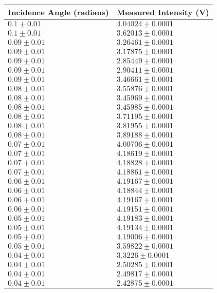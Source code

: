 \begin{tabular}{| p{} | p{} |}
\hline
Incidence Angle (radians) & Measured Intensity (V)\\
\hline
$0.1 \pm 0.01$ & $4.04024 \pm 0.0001$\\
$0.1 \pm 0.01$ & $3.62013 \pm 0.0001$\\
$0.09 \pm 0.01$ & $3.26461 \pm 0.0001$\\
$0.09 \pm 0.01$ & $3.17875 \pm 0.0001$\\
$0.09 \pm 0.01$ & $2.85449 \pm 0.0001$\\
$0.09 \pm 0.01$ & $2.90411 \pm 0.0001$\\
$0.09 \pm 0.01$ & $3.46661 \pm 0.0001$\\
$0.08 \pm 0.01$ & $3.55876 \pm 0.0001$\\
$0.08 \pm 0.01$ & $3.45969 \pm 0.0001$\\
$0.08 \pm 0.01$ & $3.45985 \pm 0.0001$\\
$0.08 \pm 0.01$ & $3.71195 \pm 0.0001$\\
$0.08 \pm 0.01$ & $3.81955 \pm 0.0001$\\
$0.08 \pm 0.01$ & $3.89188 \pm 0.0001$\\
$0.07 \pm 0.01$ & $4.00706 \pm 0.0001$\\
$0.07 \pm 0.01$ & $4.18619 \pm 0.0001$\\
$0.07 \pm 0.01$ & $4.18828 \pm 0.0001$\\
$0.07 \pm 0.01$ & $4.18861 \pm 0.0001$\\
$0.06 \pm 0.01$ & $4.19167 \pm 0.0001$\\
$0.06 \pm 0.01$ & $4.18844 \pm 0.0001$\\
$0.06 \pm 0.01$ & $4.19167 \pm 0.0001$\\
$0.06 \pm 0.01$ & $4.19151 \pm 0.0001$\\
$0.05 \pm 0.01$ & $4.19183 \pm 0.0001$\\
$0.05 \pm 0.01$ & $4.19134 \pm 0.0001$\\
$0.05 \pm 0.01$ & $4.19006 \pm 0.0001$\\
$0.05 \pm 0.01$ & $3.59822 \pm 0.0001$\\
$0.04 \pm 0.01$ & $3.3226 \pm 0.0001$\\
$0.04 \pm 0.01$ & $2.50285 \pm 0.0001$\\
$0.04 \pm 0.01$ & $2.49817 \pm 0.0001$\\
$0.04 \pm 0.01$ & $2.42875 \pm 0.0001$\\
\hline
\end{tabular}